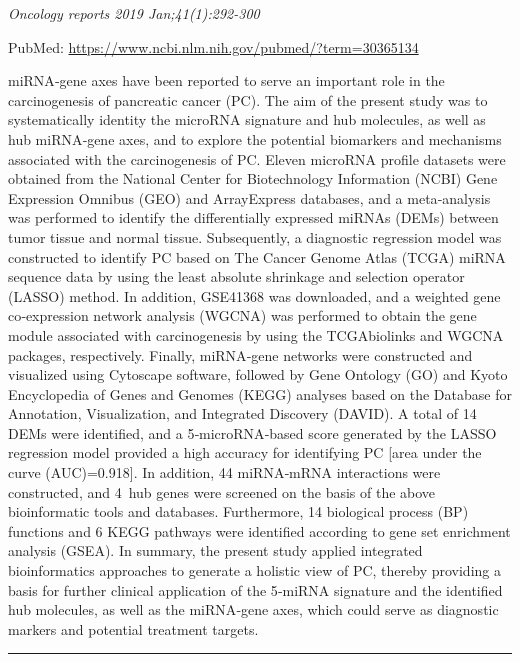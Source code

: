 \documentclass[]{article}
\begin{document}
\emph{Oncology reports 2019 Jan;41(1):292-300}

PubMed: \url{https://www.ncbi.nlm.nih.gov/pubmed/?term=30365134}

miRNA‑gene axes have been reported to serve an important role in the
carcinogenesis of pancreatic cancer (PC). The aim of the present study
was to systematically identity the microRNA signature and hub molecules,
as well as hub miRNA‑gene axes, and to explore the potential biomarkers
and mechanisms associated with the carcinogenesis of PC. Eleven microRNA
profile datasets were obtained from the National Center for
Biotechnology Information (NCBI) Gene Expression Omnibus (GEO) and
ArrayExpress databases, and a meta‑analysis was performed to identify
the differentially expressed miRNAs (DEMs) between tumor tissue and
normal tissue. Subsequently, a diagnostic regression model was
constructed to identify PC based on The Cancer Genome Atlas (TCGA) miRNA
sequence data by using the least absolute shrinkage and selection
operator (LASSO) method. In addition, GSE41368 was downloaded, and a
weighted gene co‑expression network analysis (WGCNA) was performed to
obtain the gene module associated with carcinogenesis by using the
TCGAbiolinks and WGCNA packages, respectively. Finally, miRNA‑gene
networks were constructed and visualized using Cytoscape software,
followed by Gene Ontology (GO) and Kyoto Encyclopedia of Genes and
Genomes (KEGG) analyses based on the Database for Annotation,
Visualization, and Integrated Discovery (DAVID). A total of 14 DEMs were
identified, and a 5‑microRNA‑based score generated by the LASSO
regression model provided a high accuracy for identifying PC {[}area
under the curve (AUC)=0.918{]}. In addition, 44 miRNA‑mRNA interactions
were constructed, and 4~hub genes were screened on the basis of the
above bioinformatic tools and databases. Furthermore, 14 biological
process (BP) functions and 6 KEGG pathways were identified according to
gene set enrichment analysis (GSEA). In summary, the present study
applied integrated bioinformatics approaches to generate a holistic view
of PC, thereby providing a basis for further clinical application of the
5‑miRNA signature and the identified hub molecules, as well as the
miRNA‑gene axes, which could serve as diagnostic markers and potential
treatment targets.

{}

{}

\begin{center}\rule{0.5\linewidth}{\linethickness}\end{center}
\end{document}

